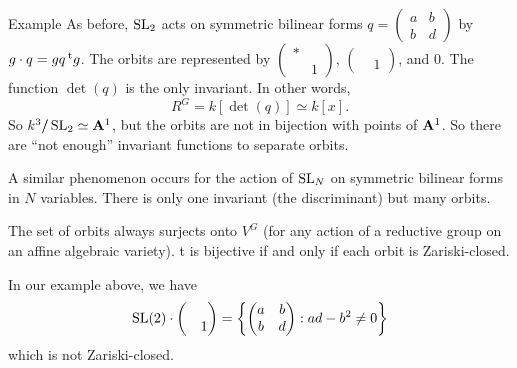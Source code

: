 \begin{enonce}[remark]{Example}
As before, $\operatorname{SL}_2$ acts on symmetric bilinear forms 
$q=\begin{pmatrix} a & b \\ b & d \end{pmatrix}$ by 
$g\cdot q= g q \prescript{\mathrm{t}}{}{g}$. The orbits are represented by 
$\begin{pmatrix} \ast \\ & 1 \end{pmatrix}$, 
$\begin{pmatrix} \\ & 1 \end{pmatrix}$, and $0$. The function 
$\det(q)$ is the only invariant. In other words, 
\[
  R^G=k[\det(q)]\simeq k[x] .
\]
So $k^3/ \! \! \! / \operatorname{SL}_2\simeq \mathbf{A}^1$, but the orbits are not in 
bijection with points of $\mathbf{A}^1$. So there are ``not enough'' invariant 
functions to separate orbits. 
\end{enonce}

A similar phenomenon occurs for the action of $\operatorname{SL}_N$ on 
symmetric bilinear forms in $N$ variables. There is only one invariant (the 
discriminant) but many orbits. 

\begin{theo}
The set of orbits always surjects onto $V^G$ (for any action of a reductive 
group on an affine algebraic variety). t is bijective if and only if each orbit 
is Zariski-closed. 
\end{theo}

In our example above, we have
\[
  \operatorname{SL}(2)\cdot \begin{pmatrix} \\ & 1\end{pmatrix} = \left\{\begin{pmatrix} a & b \\ b & d \end{pmatrix} : a d-b^2\ne 0\right\} 
\]
which is not Zariski-closed. 



